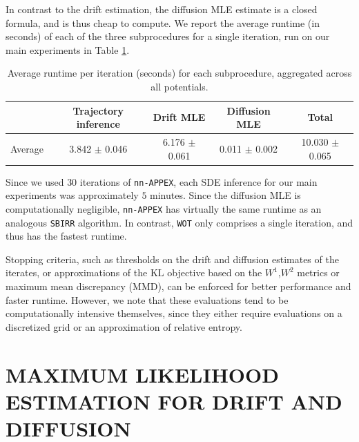 \documentclass[twoside]{article}
\newcommand{\nappex}{\texttt{nn-APPEX}}
\newcommand{\wot}{\texttt{WOT}}
\newcommand{\sbirr}{\texttt{SBIRR}}
\begin{document}
In contrast to the drift estimation, the diffusion MLE estimate is a closed formula, and is thus cheap to compute. We report the average runtime (in seconds) of each of the three subprocedures for a single iteration, run on our main experiments in Table \ref{tab:appex_timing_overall}.

\begin{table}[htbp!]
\centering
\small
\caption{Average runtime per iteration (seconds) for each subprocedure, aggregated across all potentials.}
\begin{tabular}{lcccc}
\toprule
& \textbf{Trajectory inference} & \textbf{Drift MLE} & \textbf{Diffusion MLE} & \textbf{Total} \\
\midrule
Average & 3.842 $\pm$ 0.046 & 6.176 $\pm$ 0.061 & 0.011 $\pm$ 0.002 & 10.030 $\pm$ 0.065 \\
\bottomrule
\end{tabular}
\label{tab:appex_timing_overall}
\end{table}

Since we used $30$ iterations of \nappex{}, each SDE inference for our main experiments was approximately $5$ minutes. Since the diffusion MLE is computationally negligible, \nappex{} has virtually the same runtime as an analogous \sbirr{} algorithm. In contrast, \wot{} only comprises a single iteration, and thus has the fastest runtime.

Stopping criteria, such as thresholds on the drift and diffusion estimates of the iterates, or approximations of the $\mathrm{KL}$ objective based on the $W^1$,$W^2$ metrics or maximum mean discrepancy (MMD),  can be enforced for better performance and faster runtime. However, we note that these evaluations tend to be computationally intensive themselves, since they either require evaluations on a discretized grid or an approximation of relative entropy.



\section{MAXIMUM LIKELIHOOD ESTIMATION FOR DRIFT AND DIFFUSION}
\label{sec: MLE_appendix}
\end{document}
